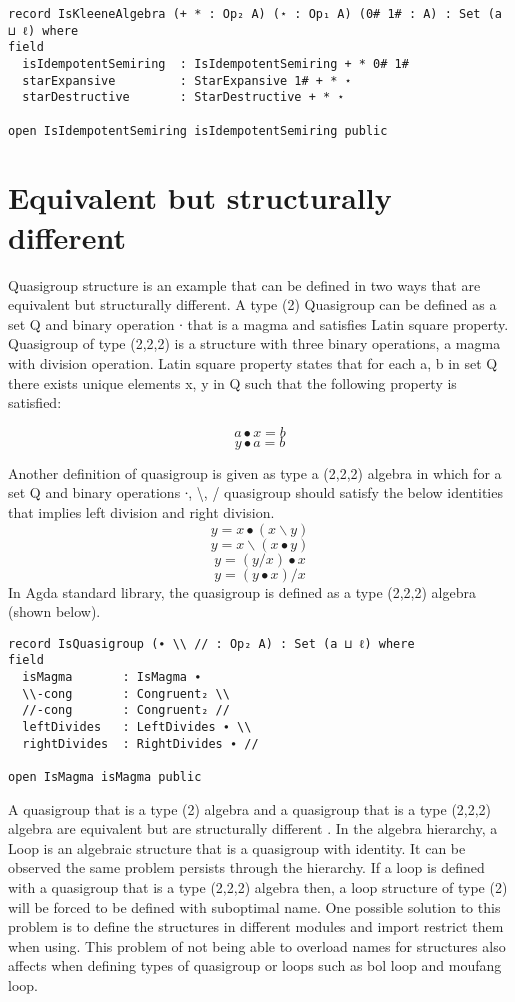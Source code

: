 \begin{verbatim}
record IsKleeneAlgebra (+ * : Op₂ A) (⋆ : Op₁ A) (0# 1# : A) : Set (a ⊔ ℓ) where
field
  isIdempotentSemiring  : IsIdempotentSemiring + * 0# 1#
  starExpansive         : StarExpansive 1# + * ⋆
  starDestructive       : StarDestructive + * ⋆

open IsIdempotentSemiring isIdempotentSemiring public
\end{verbatim}

\section{Equivalent but structurally different}
Quasigroup structure is an example that can be defined in two ways that are
equivalent but structurally different. A type (2) Quasigroup can be defined as a
set Q and binary operation ∙ that is a magma and satisfies Latin square
property. Quasigroup of type (2,2,2) is a structure with three binary
operations, a magma with division operation. Latin square property states that
for each a, b in set Q there exists unique elements x, y in Q such that the
following property is satisfied:
\begin{center}
\[a ∙ x = b\]
\[y ∙ a = b\]
\end{center}
Another definition of quasigroup is given as type a (2,2,2) algebra in which for a
set Q and binary operations ∙, \textbackslash{}, / quasigroup should satisfy
the below identities that implies left division and right division. 
\[y = x ∙ (x \backslash y)\]
\[y = x \backslash (x ∙ y)\]
\[y = (y / x) ∙ x\]
\[y = (y ∙ x) / x\] 
In Agda standard library, the quasigroup is defined as a
type (2,2,2) algebra (shown below).

\begin{verbatim}
record IsQuasigroup (∙ \\ // : Op₂ A) : Set (a ⊔ ℓ) where
field
  isMagma       : IsMagma ∙
  \\-cong       : Congruent₂ \\
  //-cong       : Congruent₂ //
  leftDivides   : LeftDivides ∙ \\
  rightDivides  : RightDivides ∙ //

open IsMagma isMagma public
\end{verbatim}

A quasigroup that is a type (2) algebra and a quasigroup that is a type (2,2,2)
algebra are equivalent but are structurally different \cite{flinn2021algebraic}. In the
algebra hierarchy, a Loop is an algebraic structure that is a quasigroup with
identity. It can be observed the same problem persists through the hierarchy. If
a loop is defined with a quasigroup that is a type (2,2,2) algebra then, a
loop structure of type (2) will be forced to be defined with suboptimal name.
One possible solution to this problem is to define the structures in different
modules and import restrict them when using. This problem of not being able to
overload names for structures also affects when defining types of quasigroup or
loops such as bol loop and moufang loop.

